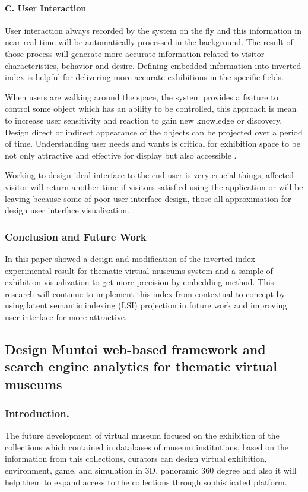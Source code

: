 \paragraph{C. User Interaction}
User interaction always recorded by the system on the fly and this information in near real-time will be automatically processed in the background. The result of those process will generate more accurate information related to visitor characteristics, behavior and desire. Defining embedded information into inverted index is helpful for delivering more accurate exhibitions in the specific fields.

When users are walking around the space, the system provides a feature to control some object which has an ability to be controlled, this approach is mean to increase user sensitivity and reaction to gain new knowledge or discovery. Design direct or indirect appearance of the objects can be projected over a period of time. Understanding user needs and wants is critical for exhibition space to be not only attractive and effective for display but also accessible \cite{LordPiacente}.

Working to design ideal interface to the end-user is very crucial things, affected visitor will return another time if visitors satisfied using the application or will be leaving because some of poor user interface design, those all approximation for design user interface visualization.

\subsubsection{Conclusion and Future Work}
In this paper showed a design and modification of the inverted index experimental result for thematic virtual museums system and a sample of exhibition visualization to get more precision by embedding method. This research will continue to implement this index from contextual to concept by using latent semantic indexing (LSI) projection in future work and improving user interface for more attractive.

\subsection{Design Muntoi web-based framework and search engine analytics for thematic virtual museums}\label{subsec:ch4/sec2/sub3}

\subsubsection{Introduction.} The future development of virtual museum focused on the exhibition of the collections which contained in databases of museum institutions, based on the information from this collections, curators can design virtual exhibition, environment, game, and simulation in 3D, panoramic 360 degree and also it will help them to expand access to the collections through sophisticated platform.

